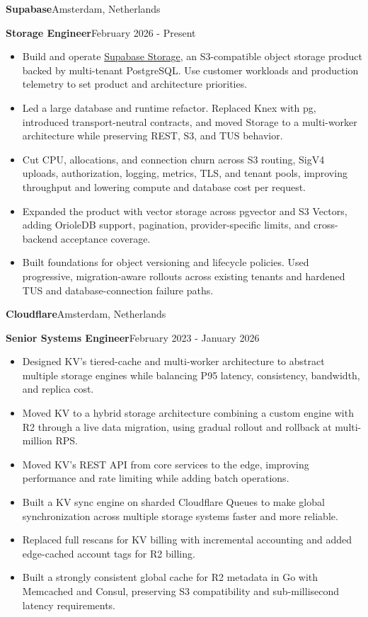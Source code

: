 \documentclass[11pt,a4paper]{article}
\newcommand{\role}[4]{%
  {\large\bfseries\color{ink}#1}\hfill{\small\color{muted}#2}\par
  {\bfseries\color{accent}#3}\hfill{\small\color{muted}#4}\par
}
\begin{document}
\role{Supabase}{Amsterdam, Netherlands}{Storage Engineer}{February 2026 - Present}
\begin{itemize}
  \item Build and operate \href{https://github.com/supabase/storage}{Supabase Storage}, an S3-compatible object storage product backed by multi-tenant PostgreSQL. Use customer workloads and production telemetry to set product and architecture priorities.
  \item Led a large database and runtime refactor. Replaced Knex with pg, introduced transport-neutral contracts, and moved Storage to a multi-worker architecture while preserving REST, S3, and TUS behavior.
  \item Cut CPU, allocations, and connection churn across S3 routing, SigV4 uploads, authorization, logging, metrics, TLS, and tenant pools, improving throughput and lowering compute and database cost per request.
  \item Expanded the product with vector storage across pgvector and S3 Vectors, adding OrioleDB support, pagination, provider-specific limits, and cross-backend acceptance coverage.
  \item Built foundations for object versioning and lifecycle policies. Used progressive, migration-aware rollouts across existing tenants and hardened TUS and database-connection failure paths.
\end{itemize}

\vspace{4pt}
\role{Cloudflare}{Amsterdam, Netherlands}{Senior Systems Engineer}{February 2023 - January 2026}
\begin{itemize}
  \item Designed KV's tiered-cache and multi-worker architecture to abstract multiple storage engines while balancing P95 latency, consistency, bandwidth, and replica cost.
  \item Moved KV to a hybrid storage architecture combining a custom engine with R2 through a live data migration, using gradual rollout and rollback at multi-million RPS.
  \item Moved KV's REST API from core services to the edge, improving performance and rate limiting while adding batch operations.
  \item Built a KV sync engine on sharded Cloudflare Queues to make global synchronization across multiple storage systems faster and more reliable.
  \item Replaced full rescans for KV billing with incremental accounting and added edge-cached account tags for R2 billing.
  \item Built a strongly consistent global cache for R2 metadata in Go with Memcached and Consul, preserving S3 compatibility and sub-millisecond latency requirements.
\end{itemize}
\end{document}
